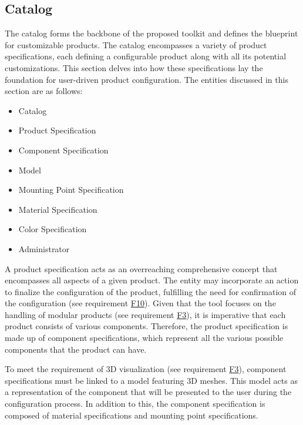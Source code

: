\subsection{Catalog}

The catalog forms the backbone of the proposed toolkit and defines the blueprint for customizable products. The catalog encompasses a variety of product specifications, each defining a configurable product along with all its potential customizations. This section delves into how these specifications lay the foundation for user-driven product configuration.
The entities discussed in this section are as follows:
\begin{itemize}[label=\rectanglebullet]
    \item Catalog
    \item Product Specification
    \item Component Specification
    \item Model
    \item Mounting Point Specification
    \item Material Specification
    \item Color Specification
    \item Administrator
\end{itemize}

A product specification acts as an overreaching comprehensive concept that encompasses all aspects of a given product. The entity may incorporate an action to finalize the configuration of the product, fulfilling the need for confirmation of the configuration (see requirement \hyperref[itm:F10]{F10}). Given that the tool focuses on the handling of modular products (see requirement \hyperref[itm:F3]{F3}), it is imperative that each product consists of various components. Therefore, the product specification is made up of component specifications, which represent all the various possible components that the product can have.

To meet the requirement of 3D visualization (see requirement \hyperref[itm:F3]{F3}), component specifications must be linked to a model featuring 3D meshes. This model acts as a representation of the component that will be presented to the user during the configuration process. In addition to this, the component specification is composed of material specifications and mounting point specifications.

